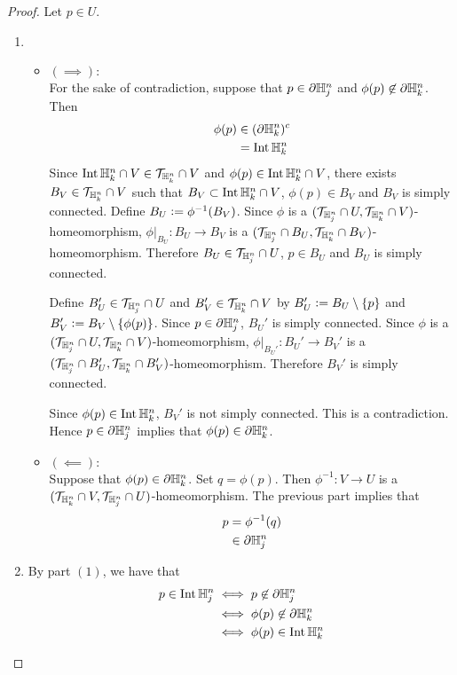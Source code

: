 \documentclass{book}
\begin{document}
	\begin{proof} Let $p \in U$.
		\begin{enumerate}
			\item 
			\begin{itemize}
				\item $(\implies):$ \\
				For the sake of contradiction, suppose that $p \in \partial \mathbb{H}^n_j$ and $\phi(p) \not \in \partial \mathbb{H}^n_k$. Then 
				\begin{align*}
					\phi(p)
					& \in (\partial \mathbb{H}^n_k)^c \\
					& = \operatorname{Int} \mathbb{H}^n_k
				\end{align*}
				Since $\operatorname{Int} \mathbb{H}^n_k \cap V \in \mathcal{T}_{\mathbb{H}^n_k} \cap V$ and $\phi(p) \in \operatorname{Int} \mathbb{H}^n_k \cap V$, there exists $B_V \in \mathcal{T}_{\mathbb{H}^n_k} \cap V$ such that $B_V \subset \operatorname{Int} \mathbb{H}^n_k \cap V$, $\phi(p) \in B_V$ and $B_V$ is simply connected. Define $B_U \vcentcolon= \phi^{-1}(B_V)$. Since $\phi$ is a $(\mathcal{T}_{\mathbb{H}^n_j} \cap U, \mathcal{T}_{\mathbb{H}^n_k} \cap V)$-homeomorphism, $\phi|_{B_U}: B_U \rightarrow B_V$ is a $(\mathcal{T}_{\mathbb{H}^n_j} \cap B_U, \mathcal{T}_{\mathbb{H}^n_k} \cap B_V)$-homeomorphism. Therefore $B_U \in \mathcal{T}_{\mathbb{H}^n_j} \cap U$, $p \in B_U$ and $B_U$ is simply connected. 
				
				Define $B_U' \in \mathcal{T}_{\mathbb{H}^n_j} \cap U$ and $B_V' \in \mathcal{T}_{\mathbb{H}^n_k} \cap V$ by $B_U' \vcentcolon= B_U \setminus \{p\}$ and $B_V' \vcentcolon= B_V \setminus \{\phi(p)\}$. Since $p \in \partial \mathbb{H}^n_j$, $B_U'$ is simply connected. Since $\phi$ is a $(\mathcal{T}_{\mathbb{H}^n_j} \cap U, \mathcal{T}_{\mathbb{H}^n_k} \cap V)$-homeomorphism, $\phi|_{B_U'}: B_U' \rightarrow B_V'$ is a $(\mathcal{T}_{\mathbb{H}^n_j} \cap B_U', \mathcal{T}_{\mathbb{H}^n_k} \cap B_V')$-homeomorphism. Therefore $B_V'$ is simply connected. 
				
				Since $\phi(p) \in \operatorname{Int} \mathbb{H}^n_k$, $B_V'$ is not simply connected. This is a contradiction. Hence $p \in \partial \mathbb{H}^n_j$ implies that $\phi(p) \in \partial \mathbb{H}^n_k$.
				\item $(\impliedby):$ \\
				Suppose that $\phi(p) \in \partial \mathbb{H}^n_k$. Set $q = \phi(p)$. Then $\phi^{-1}:V \rightarrow U$ is a $(\mathcal{T}_{\mathbb{H}^n_k} \cap V, \mathcal{T}_{\mathbb{H}^n_j} \cap U)$-homeomorphism. The previous part implies that 
				\begin{align*}
					p
					& = \phi^{-1}(q) \\
					& \in \partial \mathbb{H}^n_j
				\end{align*}
			\end{itemize}
			\item By part $(1)$, we have that 
			\begin{align*}
				p \in \operatorname{Int} \mathbb{H}^n_j
				& \iff p \not \in \partial \mathbb{H}^n_j \\
				& \iff \phi(p) \not \in \partial \mathbb{H}^n_k \\ 
				& \iff \phi(p) \in \operatorname{Int} \mathbb{H}^n_k 
			\end{align*}
		\end{enumerate}
	\end{proof}
\end{document}
